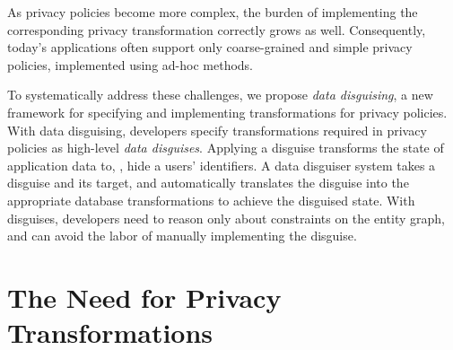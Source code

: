 As privacy policies become more complex, the burden of implementing the corresponding privacy
transformation correctly grows as well.  Consequently, today's applications often support only
coarse-grained and simple privacy policies, implemented using ad-hoc methods.


To systematically address these challenges, we propose \emph{data disguising}, a new framework for
specifying and implementing transformations for privacy policies.
%
With data disguising, developers specify transformations required in privacy policies as high-level \emph{data
disguises}. Applying a disguise transforms the state of application data to, \eg, hide a users'
identifiers.
%
%
A data disguiser system takes a disguise and its target, and automatically translates the
disguise into the appropriate database transformations to achieve the disguised state. With
disguises, developers need to reason only about constraints on the entity graph, and can avoid the
labor of manually implementing the disguise.

\section{The Need for Privacy Transformations}
\label{sec:survey}

